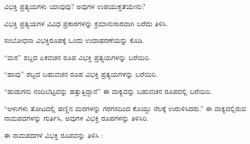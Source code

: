 
\vspace{2.5pt plus 3pt minus 0.5pt}\noindent\hspace*{1.2em}\hspace{0.55em}ವಿಭಕ್ತಿ ಪ್ರತ್ಯಯಗಳು ಯಾವುವು? ಅವುಗಳ ಉಪಯುಕ್ತತೆಯೇನು?\par

\vspace{2.5pt plus 3pt minus 0.5pt}\noindent\hspace*{1.2em}\hspace{0.55em}ವಿಭಕ್ತಿ ಪ್ರತ್ಯಯಗಳ ವಿವಿಧ ಪ್ರಕಾರಗಳನ್ನು ಕ್ರಮಾನುಸಾರವಾಗಿ ಬರೆದು ತಿಳಿಸಿ.\par

\vspace{2.5pt plus 3pt minus 0.5pt}\noindent\hspace*{1.2em}\hspace{0.55em}ಸಂಬೋಧನಾ ವಿಭಕ್ತಿರೂಪಕ್ಕೆ ಒಂದು ಉದಾಹರಣೆಯನ್ನು ಕೊಡಿ.\par

\vspace{2.5pt plus 3pt minus 0.5pt}\noindent\hspace*{1.2em}\hspace{0.55em}“ಮರ” ಶಬ್ದದ ಏಕವಚನ ರೂಪ ವಿಭಕ್ತಿ ಪ್ರತ್ಯಯಗಳನ್ನು ಬರೆಯಿರಿ.\par

\vspace{2.5pt plus 3pt minus 0.5pt}\noindent\hspace*{1.2em}\hspace{0.55em}“ಹಾವು” ಶಬ್ದದ ಬಹುವಚನ ರೂಪ ವಿಭಕ್ತಿ ಪ್ರತ್ಯಯಗಳನ್ನು ಬರೆಯಿರಿ.\par

\vspace{2.5pt plus 3pt minus 0.5pt}\noindent\hspace*{1.2em}\hspace{0.55em}“ಹುಡುಗನು ನಂದಿಬೆಟ್ಟವನ್ನು ಹತ್ತುತ್ತಿದ್ದಾನೆ” ಈ ವಾಕ್ಯವನ್ನು ಬಹುವಚನ ರೂಪದಲ್ಲಿ ಬರೆಯಿರಿ.\par

\vspace{2.5pt plus 3pt minus 0.5pt}\noindent\hspace*{1.2em}\hspace{0.55em}“ಆಳುಗಳು ತೋಟದಲ್ಲಿ ಹಣ್ಣಿನ ಮರಗಳನ್ನು ಗರಗಸದಿಂದ ಕೊಯ್ದು ನೆಲಕ್ಕೆ ಉರುಳಿಸಿದರು.” ಈ ವಾಕ್ಯದಲ್ಲಿರುವ ನಾಮಪದಗಳನ್ನು ಗುರ್ತಿಸಿ, ಅವುಗಳ ವಿಭಕ್ತಿ ರೂಪಗಳನ್ನು ತಿಳಿಸಿರಿ.\par

\vspace{2.5pt plus 3pt minus 0.5pt}\noindent\hspace*{1.2em}\hspace{0.55em}ಈ ನಾಮಪದಗಳ ವಿಭಕ್ತಿ ರೂಪವನ್ನು ತಿಳಿಸಿ :\par

